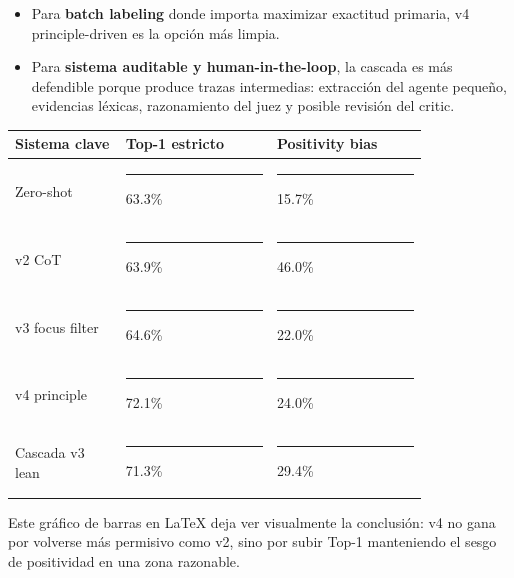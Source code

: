 \begin{itemize}
\item Para \textbf{batch labeling} donde importa maximizar exactitud primaria, v4 principle-driven es la opción más limpia.
\item Para \textbf{sistema auditable y human-in-the-loop}, la cascada es más defendible porque produce trazas intermedias: extracción del agente pequeño, evidencias léxicas, razonamiento del juez y posible revisión del critic.
\end{itemize}

\begin{center}
\scriptsize
\setlength{\tabcolsep}{5pt}
\renewcommand{\arraystretch}{1.2}
\begin{tabular}{p{0.22\linewidth}p{0.30\linewidth}p{0.30\linewidth}}
\toprule
Sistema clave & Top-1 estricto & Positivity bias \\
\midrule
Zero-shot & \rule{3.08cm}{0.8ex} 63.3\% & \rule{0.85cm}{0.8ex} 15.7\% \\
v2 CoT & \rule{3.11cm}{0.8ex} 63.9\% & \rule{2.50cm}{0.8ex} 46.0\% \\
v3 focus filter & \rule{3.14cm}{0.8ex} 64.6\% & \rule{1.20cm}{0.8ex} 22.0\% \\
v4 principle & \rule{3.50cm}{0.8ex} 72.1\% & \rule{1.30cm}{0.8ex} 24.0\% \\
Cascada v3 lean & \rule{3.46cm}{0.8ex} 71.3\% & \rule{1.60cm}{0.8ex} 29.4\% \\
\bottomrule
\end{tabular}
\end{center}

Este gráfico de barras en LaTeX deja ver visualmente la conclusión: v4 no gana por volverse más permisivo como v2, sino por subir Top-1 manteniendo el sesgo de positividad en una zona razonable.




